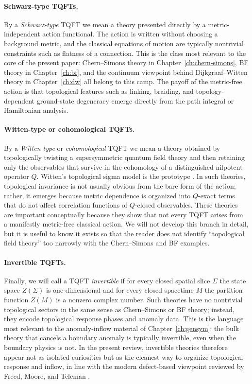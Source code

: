 \paragraph{Schwarz-type TQFTs.}
By a \emph{Schwarz-type} TQFT we mean a theory presented directly by a metric-independent action functional. The action is written without choosing a background metric, and the classical equations of motion are typically nontrivial constraints such as flatness of a connection. This is the class most relevant to the core of the present paper: Chern--Simons theory in Chapter~\ref{ch:chern-simons}, BF theory in Chapter~\ref{ch:bf}, and the continuum viewpoint behind Dijkgraaf--Witten theory in Chapter~\ref{ch:dw} all belong to this camp. The payoff of the metric-free action is that topological features such as linking, braiding, and topology-dependent ground-state degeneracy emerge directly from the path integral or Hamiltonian analysis.

\paragraph{Witten-type or cohomological TQFTs.}
By a \emph{Witten-type} or \emph{cohomological} TQFT we mean a theory obtained by topologically twisting a supersymmetric quantum field theory and then retaining only the observables that survive in the cohomology of a distinguished nilpotent operator $Q$. Witten's topological sigma model is the prototype \cite{Witten1988Sigma}. In such theories, topological invariance is not usually obvious from the bare form of the action; rather, it emerges because metric dependence is organized into $Q$-exact terms that do not affect correlation functions of $Q$-closed observables. These theories are important conceptually because they show that not every TQFT arises from a manifestly metric-free classical action. We will not develop this branch in detail, but it is useful to know it exists so that the reader does not identify ``topological field theory'' too narrowly with the Chern--Simons and BF examples.

\paragraph{Invertible TQFTs.}
Finally, we will call a TQFT \emph{invertible} if for every closed spatial slice $\Sigma$ the state space $Z(\Sigma)$ is one-dimensional and for every closed spacetime $M$ the partition function $Z(M)$ is a nonzero complex number. Such theories have no nontrivial topological sectors in the same sense as Chern--Simons or BF theory; instead, they encode topological response phases and anomaly data. This is the language most relevant to the anomaly-inflow material of Chapter~\ref{ch:gensym}: the bulk theory that cancels a boundary anomaly is typically invertible, even when the boundary physics is not. In the present review, invertible theories therefore appear not as isolated curiosities but as the cleanest way to organize topological response and inflow, in line with the modern defect-based viewpoint reviewed by Freed, Moore, and Teleman \cite{FreedMooreTeleman2024}.


